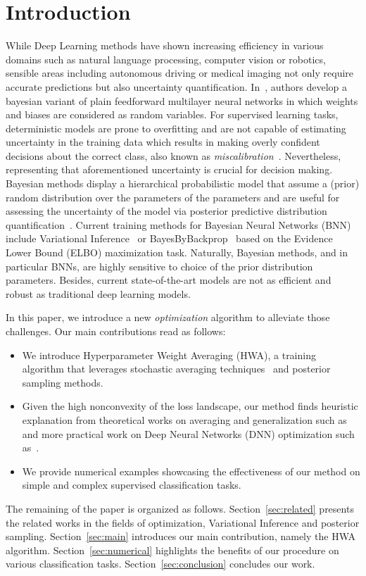\documentclass[tablecaption=bottom,wcp]{jmlr} %
\begin{document}
\section{Introduction}
While Deep Learning methods have shown increasing efficiency in various domains such as natural language processing, computer vision or robotics, sensible areas including autonomous driving or medical imaging not only require accurate predictions but also uncertainty quantification.
In~\citep{neal2012bayesian}, authors develop a bayesian variant of plain feedforward multilayer neural networks in which weights and biases are considered as random variables.
For supervised learning tasks, deterministic models are prone to overfitting and are not capable of estimating uncertainty in the training data which results in making overly confident decisions about the correct class, also known as \emph{miscalibration}~\citep{guo2017calibration,kendall2017uncertainties}.
Nevertheless, representing that aforementioned uncertainty is crucial for decision making.
Bayesian methods display a hierarchical probabilistic model that assume a (prior) random distribution over the parameters of the parameters and are useful for assessing the uncertainty of the model via posterior predictive distribution quantification~\citep{blundell2015weight,kingma2015variational}.
Current training methods for Bayesian Neural Networks (BNN)~\citep{neal2012bayesian} include Variational Inference~\citep{graves2011practical, hoffman2013stochastic} or BayesByBackprop~\citep{blundell2015weight} based on the Evidence Lower Bound (ELBO) maximization task.
Naturally, Bayesian methods, and in particular BNNs, are highly sensitive to choice of the prior distribution parameters.
Besides, current state-of-the-art models are not as efficient and robust as traditional deep learning models.

In this paper, we introduce a new \emph{optimization} algorithm to alleviate those challenges.
Our main contributions read as follows:
\begin{itemize}
\item We introduce Hyperparameter Weight Averaging (HWA), a training algorithm that leverages stochastic averaging techniques~\citep{polyak1992acceleration} and posterior sampling methods.
\item Given the high nonconvexity of the loss landscape, our method finds heuristic explanation from theoretical works on averaging and generalization such as~\citep{keskar2016large,he2019asymmetric} and more practical work on Deep Neural Networks (DNN) optimization such as~\citep{izmailov2018averaging}.
\item We provide numerical examples showcasing the effectiveness of our method on simple and complex supervised classification tasks.
\end{itemize}
The remaining of the paper is organized as follows.
Section~\ref{sec:related} presents the related works in the fields of optimization, Variational Inference and posterior sampling.
Section~\ref{sec:main} introduces our main contribution, namely the HWA algorithm.
Section~\ref{sec:numerical} highlights the benefits of our procedure on various classification tasks.
Section~\ref{sec:conclusion} concludes our work.
 
\end{document}
